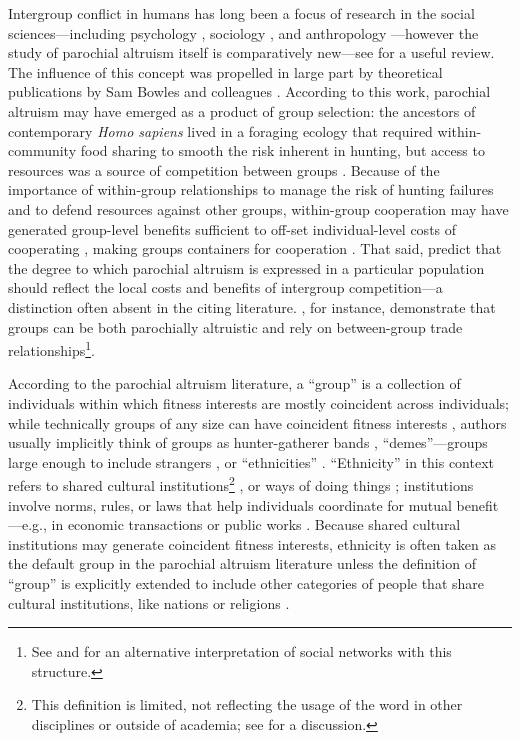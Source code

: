 \documentclass[bibauthoryear]{aa}
\begin{document}
Intergroup conflict in humans has long been a focus of research in the social sciences---including psychology \citep[e.g.,][]{tajfel1982social, yamagishi2016parochial}, sociology \citep[e.g.,][]{gluckman1960tribalism}, and anthropology \citep{Vayda1961}---however the study of parochial altruism itself is comparatively new---see \citet{de2014parochial} for a useful review. 
 The influence of this concept was propelled in large part by  theoretical publications by Sam Bowles and colleagues \citep{choi2007coevolution, bowles2003origins, bowles2004persistent}. According to this work, parochial altruism may have emerged as a product of group selection: the ancestors of contemporary \textit{Homo sapiens} lived in a foraging ecology that required within-community food sharing to smooth the risk inherent in hunting, but access to resources was a source of competition between groups \citep{choi2007coevolution}. Because of the importance of within-group relationships to  manage the risk of hunting failures and to defend resources against other groups, within-group cooperation may have generated group-level benefits sufficient to off-set individual-level costs of cooperating \citep{choi2007coevolution}, making groups containers for cooperation \citep{boydricherson1985}. That said, \citet{bowles2003origins} predict that the degree to which parochial altruism is expressed in a particular population should reflect the local costs and benefits of intergroup competition---a distinction often absent in the citing literature.  \citet{bowles2004persistent}, for instance, demonstrate that groups can be both parochially altruistic and rely on between-group trade relationships\footnote{See \citet{yamagishi2011trust} and \citet{yamagishi2016parochial} for an alternative interpretation of social networks with this structure.}.

According to the parochial altruism literature, a ``group'' is a collection of individuals within which fitness interests are mostly coincident across individuals; while technically groups of any size can have coincident fitness interests \citep{richerson2008not}, authors usually implicitly think of groups as hunter-gatherer bands \citep{bowles2003origins}, ``demes''---groups large enough to include strangers \citep[see][for a discussion]{brewer2006evolutionary}, or ``ethnicities'' \citep{choi2007coevolution}. ``Ethnicity'' in this context refers to shared cultural institutions\footnote{This definition is limited, not reflecting the usage of the word in other disciplines or outside of academia; see \citet{jenkins1994rethinking} for a discussion.} \citep{barth1956ecologic, barth1998ethnic}, or ways of doing things \citep{north1991}; institutions involve norms, rules, or laws that help individuals coordinate for mutual benefit---e.g., in economic transactions or public works \citep{glowacki2020}. Because shared cultural institutions may generate coincident fitness interests, ethnicity is often taken as the default group in the parochial altruism literature unless the definition of ``group'' is explicitly extended to include other categories of people that share cultural institutions, like nations \citep{greene2013moral} or religions \citep{purzycki2016moralistic}. 
\end{document}
